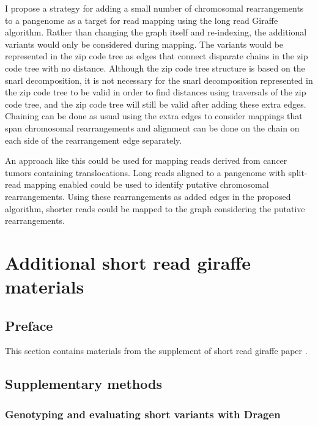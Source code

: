 \documentclass[11pt]{ucscthesis}
\begin{document}
I propose a strategy for adding a small number of chromosomal rearrangements to a pangenome as a target for read mapping using the long read Giraffe algorithm.
Rather than changing the graph itself and re-indexing, the additional variants would only be considered during mapping.
The variants would be represented in the zip code tree as edges that connect disparate chains in the zip code tree with no distance.
Although the zip code tree structure is based on the snarl decomposition, it is not necessary for the snarl decomposition represented in the zip code tree to be valid in order to find distances using traversals of the zip code tree, and the zip code tree will still be valid after adding these extra edges.
Chaining can be done as usual using the extra edges to consider mappings that span chromosomal rearrangements and alignment can be done on the chain on each side of the rearrangement edge separately.

An approach like this could be used for mapping reads derived from cancer tumors containing translocations.
Long reads aligned to a pangenome with split-read mapping enabled could be used to identify putative chromosomal rearrangements.
Using these rearrangements as added edges in the proposed algorithm, shorter reads could be mapped to the graph considering the putative rearrangements. 



\appendix
\chapter{Additional short read giraffe materials}
\label{sec:appendix_sr_giraffe}
\section{Preface}
This section contains materials from the supplement of short read giraffe paper \cite{sr_giraffe_2021}. 

\section{Supplementary methods}

\subsection{Genotyping and evaluating short variants with Dragen}
\label{subsec:aim2:dragen}
\end{document}
